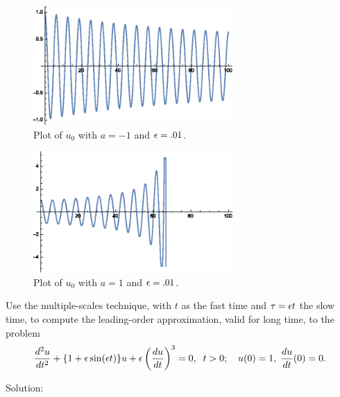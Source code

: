 \begin{figure}[h]
  \centering
  \includegraphics[width=3in]{pertsHW5no1img1.eps}
  \caption{Plot of $u_0$ with $a=-1$ and $\epsilon=.01$. }
\end{figure}
\begin{figure}
  \centering
  \includegraphics[width=3in]{pertsHW5no1img2.eps}
  \caption{Plot of $u_0$ with $a=1$ and $\epsilon=.01$.}
\end{figure}

\pagebreak

\item Use the multiple-scales technique, with $t$ as the fast time and $\tau = \epsilon t$ the slow time, to compute the leading-order approximation, valid for long time, to the problem
%
\begin{equation*}
\frac{d^2u}{dt^2} + \{1+\epsilon \sin(\epsilon t)\} u + \epsilon \left(\frac{du}{dt} \right)^3 = 0, \;\; t>0; \quad u(0)=1,\;\frac{du}{dt}(0)=0.
\end{equation*}

Solution:\\

